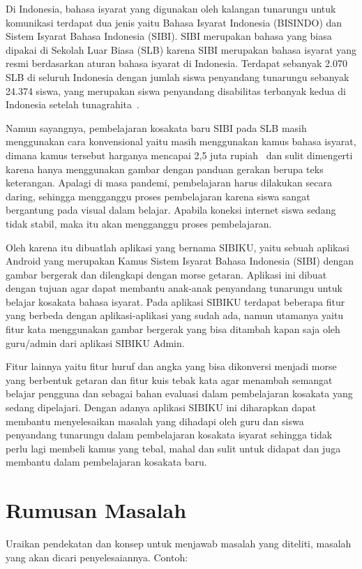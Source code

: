 \documentclass[a4paper,11pt,oneside]{report}
\begin{document}
Di Indonesia, bahasa isyarat yang digunakan oleh kalangan tunarungu untuk
komunikasi terdapat dua jenis yaitu Bahasa Isyarat Indonesia (BISINDO) dan
Sistem Isyarat Bahasa Indonesia (SIBI). SIBI merupakan bahasa yang biasa
dipakai di Sekolah Luar Biasa (SLB) karena SIBI merupakan bahasa isyarat yang
resmi berdasarkan aturan bahasa isyarat di Indonesia. Terdapat sebanyak 2.070
SLB di seluruh Indonesia dengan jumlah siswa penyandang tunarungu sebanyak
24.374 siswa, yang merupakan siswa penyandang disabilitas terbanyak kedua di
Indonesia setelah tunagrahita~\cite{ref3}.

Namun sayangnya, pembelajaran kosakata baru SIBI pada SLB masih menggunakan
cara konvensional yaitu masih menggunakan kamus bahasa isyarat, dimana kamus
tersebut harganya mencapai 2,5 juta rupiah~\cite{ref4} dan sulit dimengerti
karena hanya menggunakan gambar dengan panduan gerakan berupa teks keterangan.
Apalagi di masa pandemi, pembelajaran harus dilakukan secara daring, sehingga
mengganggu proses pembelajaran karena siswa sangat bergantung pada visual dalam
belajar. Apabila koneksi internet siswa sedang tidak stabil, maka itu akan
mengganggu proses pembelajaran.

Oleh karena itu dibuatlah aplikasi yang bernama SIBIKU, yaitu sebuah aplikasi
Android yang merupakan Kamus Sistem Isyarat Bahasa Indonesia (SIBI) dengan
gambar bergerak dan dilengkapi dengan morse getaran. Aplikasi ini dibuat dengan
tujuan agar dapat membantu anak-anak penyandang tunarungu untuk belajar
kosakata bahasa isyarat. Pada aplikasi SIBIKU terdapat beberapa fitur yang
berbeda dengan aplikasi-aplikasi yang sudah ada, namun utamanya yaitu fitur kata
menggunakan gambar bergerak yang bisa ditambah kapan saja oleh guru/admin dari
aplikasi SIBIKU Admin.

Fitur lainnya yaitu fitur huruf dan angka yang bisa dikonversi menjadi morse
yang berbentuk getaran dan fitur kuis tebak kata agar menambah semangat belajar
pengguna dan sebagai bahan evaluasi dalam pembelajaran kosakata yang sedang
dipelajari. Dengan adanya aplikasi SIBIKU ini diharapkan dapat membantu
menyelesaikan masalah yang dihadapi oleh guru dan siswa penyandang tunarungu
dalam pembelajaran kosakata isyarat sehingga tidak perlu lagi membeli kamus yang
tebal, mahal dan sulit untuk didapat dan juga membantu dalam pembelajaran
kosakata baru.

\section{Rumusan Masalah}
Uraikan pendekatan dan konsep untuk menjawab masalah yang diteliti, masalah
yang akan dicari penyelesaiannya. Contoh:
\end{document}
